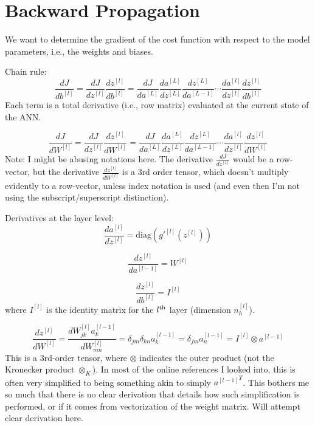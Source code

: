 \documentclass[letterpaper,12pt,oneside]{article}
\begin{document}
\section{Backward Propagation}

We want to determine the gradient of the cost function with respect to the model parameters, i.e., the weights and biases.

Chain rule:
\begin{equation}
\frac{dJ}{db^{[l]}} = \frac{dJ}{dz^{[l]}} \frac{dz^{[l]}}{db^{[l]}} = \frac{dJ}{da^{[L]}} \frac{da^{[L]}}{dz^{[L]}} \frac{dz^{[L]}}{da^{[L-1]}} \cdots \frac{da^{[l]}}{dz^{[l]}} \frac{dz^{[l]}}{db^{[l]}}
\end{equation}
Each term is a total derivative (i.e., row matrix) evaluated at the current state of the ANN.

\begin{equation}
\frac{dJ}{dW^{[l]}} = \frac{dJ}{dz^{[l]}} \frac{dz^{[l]}}{dW^{[l]}} = \frac{dJ}{da^{[L]}} \frac{da^{[L]}}{dz^{[L]}} \frac{dz^{[L]}}{da^{[L-1]}} \cdots \frac{da^{[l]}}{dz^{[l]}} \frac{dz^{[l]}}{dW^{[l]}}
\end{equation}
Note: I might be abusing notations here. The derivative $\frac{dJ}{dz^{[l]}}$ would be a row-vector, but the derivative $\frac{dz^{[l]}}{dW^{[l]}}$ is a 3rd order tensor, which doesn't multiply evidently to a row-vector, unless index notation is used (and even then I'm not using the subscript/superscript distinction).

Derivatives at the layer level:
\begin{equation}
\frac{da^{[l]}}{dz^{[l]}} = \mathrm{diag} \left( g'^{[l]} (z^{[l]}) \right)
\end{equation}

\begin{equation}
\frac{dz^{[l]}}{da^{[l-1]}} = W^{[l]}
\end{equation}

\begin{equation}
\frac{dz^{[l]}}{db^{[l]}} = I^{[l]}
\end{equation}
where $I^{[l]}$ is the identity matrix for the $l^{\rm th}$ layer (dimension $n_h^{[l]}$).

\begin{equation}
\frac{dz^{[l]}}{dW^{[l]}} = \frac{d W_{jk}^{[l]} a_k^{[l-1]}}{dW_{mn}^{[l]}} = \delta_{jm} \delta_{kn} a_k^{[l-1]} = \delta_{jm} a_n^{[l-1]} = I^{[l]} \otimes a^{[l-1]}
\end{equation}
This is a 3rd-order tensor, where $\otimes$ indicates the outer product (not the Kronecker product $\otimes_K$). In most of the online references I looked into, this is often very simplified to being something akin to simply ${a^{[l-1]}}^T$. This bothers me so much that there is no clear derivation that details how such simplification is performed, or if it comes from vectorization of the weight matrix. Will attempt clear derivation here.
\end{document}
